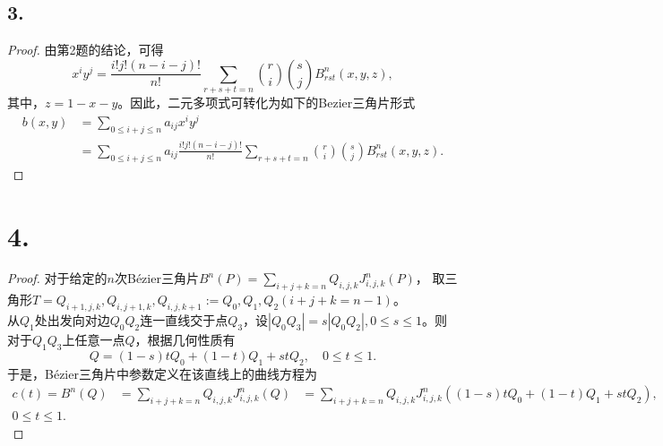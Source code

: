 \documentclass[utf8]{ctexart}
\begin{document}
\subsection*{3.}
\begin{proof}
    由第2题的结论，可得
    $$
    x^iy^j = \frac{i!j!(n-i-j)!}{n!}\sum_{r+s+t=n}\binom{r}{i}\binom{s}{j}B_{rst}^n(x,y,z),
    $$
    其中，$z=1-x-y$。因此，二元多项式可转化为如下的Bezier三角片形式
    $$
    \begin{aligned}
    b(x,y) &= \sum_{0\leq i+j\leq n}a_{ij}x^iy^j\\
    &= \sum_{0\leq i+j\leq n}a_{ij}\frac{i!j!(n-i-j)!}{n!}\sum_{r+s+t=n}\binom{r}{i}\binom{s}{j}B_{rst}^n(x,y,z).
    \end{aligned}
    $$
\end{proof}

\section*{4.}
\begin{proof}
    对于给定的$n$次Bézier三角片$B^n(P) = \sum_{i+j+k=n}Q_{i,j,k}J_{i,j,k}^n(P)$，\newline
    取三角形$T = Q_{i+1,j,k},Q_{i,j+1,k},Q_{i,j,k+1} := Q_0,Q_1,Q_2(i+j+k=n-1)$。\\
    从$Q_1$处出发向对边$Q_0Q_2$连一直线交于点$Q_3$，设$|Q_0Q_3| = s|Q_0Q_2|, 0\leq s\leq 1$。则对于$Q_1Q_3$上任意一点$Q$，根据几何性质有
    $$
    Q = (1-s)tQ_0 + (1 - t)Q_1 + stQ_2,\quad 0\leq t \leq 1.
    $$
    于是，Bézier三角片中参数定义在该直线上的曲线方程为
    $$
    \begin{aligned}
    c(t) = B^n(Q) &= \sum_{i+j+k=n}Q_{i,j,k}J_{i,j,k}^n(Q)
        &= \sum_{i+j+k=n}Q_{i,j,k}J_{i,j,k}^n((1-s)tQ_0 + (1 - t)Q_1 + stQ_2),\\
        0 \leq t \leq 1.
    \end{aligned}
        $$
\end{proof}
\end{document}

